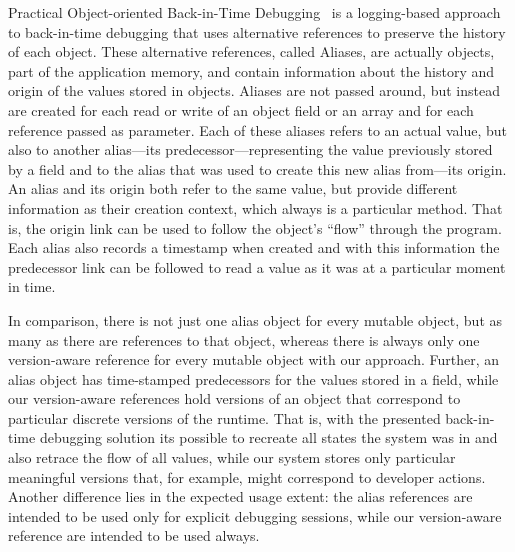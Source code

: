 Practical Object-oriented Back-in-Time Debugging~\cite{Lienhard2008POB} is a logging-based approach to back-in-time debugging that uses alternative references to preserve the history of each object.
These alternative references, called Aliases, are actually objects, part of the application memory, and contain information about the history and origin of the values stored in objects.
Aliases are not passed around, but instead are created for each read or write of an object field or an array and for each reference passed as parameter.
Each of these aliases refers to an actual value, but also to another alias---its predecessor---representing the value previously stored by a field and to the alias that was used to create this new alias from---its origin.
An alias and its origin both refer to the same value, but provide different information as their creation context, which always is a particular method.
That is, the origin link can be used to follow the object's ``flow'' through the program.
Each alias also records a timestamp when created and with this information the predecessor link can be followed to read a value as it was at a particular moment in time.

In comparison, there is not just one alias object for every mutable object, but as many as there are references to that object, whereas there is always only one version-aware reference for every mutable object with our approach.
Further, an alias object has time-stamped predecessors for the values stored in a field, while our version-aware references hold versions of an object that correspond to particular discrete versions of the runtime.
That is, with the presented back-in-time debugging solution its possible to recreate all states the system was in and also retrace the flow of all values, while our system stores only particular meaningful versions that, for example, might correspond to developer actions.
Another difference lies in the expected usage extent: the alias references are intended to be used only for explicit debugging sessions, while our version-aware reference are intended to be used always.


